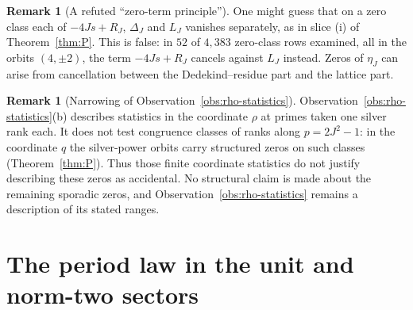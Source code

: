 \documentclass[11pt]{article}
\theoremstyle{definition}
\newtheorem{remark}[theorem]{Remark}
\begin{document}
\begin{remark}[A refuted ``zero-term principle'']
\label{rem:zero-term}
One might guess that on a zero class each of $-4Js+R_J$, $\Delta_J$ and
$L_J$ vanishes separately, as in slice (i) of Theorem~\ref{thm:P}.  This
is false: in $52$ of $4{,}383$ zero-class rows examined, all in the
orbits $(4,\pm2)$, the term $-4Js+R_J$ cancels against $L_J$ instead.
Zeros of $\eta_J$ can arise from cancellation between the
Dedekind--residue part and the lattice part.
\end{remark}

\begin{remark}[Narrowing of Observation~\ref{obs:rho-statistics}]
\label{rem:narrowing}
Observation~\ref{obs:rho-statistics}(b) describes statistics in the
coordinate $\rho$ at primes taken one silver rank each.  It does not test
congruence classes of ranks along $p=2J^2-1$: in the coordinate $q$ the
silver-power orbits carry structured zeros on such classes
(Theorem~\ref{thm:P}).  Thus those finite coordinate statistics do not
justify describing these zeros as accidental.  No structural claim is
made about the remaining sporadic zeros, and
Observation~\ref{obs:rho-statistics} remains a description of its stated
ranges.
\end{remark}

\section{The period law in the unit and norm-two sectors}
\label{sec:period-law-proved}
\end{document}
